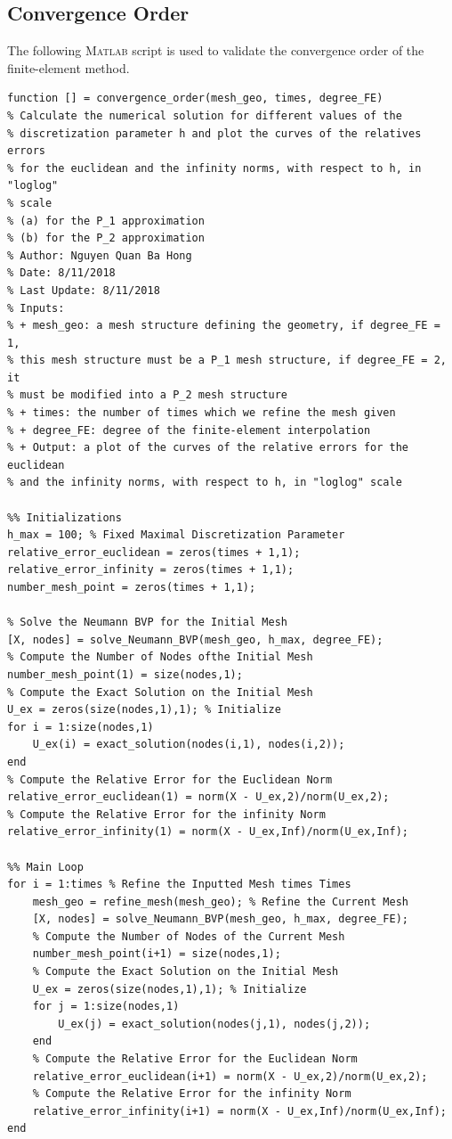 \documentclass[11pt,a4paper,center,notitlepage]{article}
\numberwithin{equation}{section}
\begin{document}
\subsection{Convergence Order}\label{sec3.5}
The following \textsc{Matlab} script is used to validate the convergence order of the finite-element method.
\begin{verbatim}
function [] = convergence_order(mesh_geo, times, degree_FE)
% Calculate the numerical solution for different values of the
% discretization parameter h and plot the curves of the relatives errors
% for the euclidean and the infinity norms, with respect to h, in "loglog"
% scale
% (a) for the P_1 approximation
% (b) for the P_2 approximation
% Author: Nguyen Quan Ba Hong
% Date: 8/11/2018
% Last Update: 8/11/2018
% Inputs:
% + mesh_geo: a mesh structure defining the geometry, if degree_FE = 1,
% this mesh structure must be a P_1 mesh structure, if degree_FE = 2, it
% must be modified into a P_2 mesh structure
% + times: the number of times which we refine the mesh given
% + degree_FE: degree of the finite-element interpolation
% + Output: a plot of the curves of the relative errors for the euclidean
% and the infinity norms, with respect to h, in "loglog" scale

%% Initializations
h_max = 100; % Fixed Maximal Discretization Parameter
relative_error_euclidean = zeros(times + 1,1);
relative_error_infinity = zeros(times + 1,1);
number_mesh_point = zeros(times + 1,1);

% Solve the Neumann BVP for the Initial Mesh
[X, nodes] = solve_Neumann_BVP(mesh_geo, h_max, degree_FE);
% Compute the Number of Nodes ofthe Initial Mesh
number_mesh_point(1) = size(nodes,1); 
% Compute the Exact Solution on the Initial Mesh
U_ex = zeros(size(nodes,1),1); % Initialize
for i = 1:size(nodes,1)
    U_ex(i) = exact_solution(nodes(i,1), nodes(i,2));
end
% Compute the Relative Error for the Euclidean Norm
relative_error_euclidean(1) = norm(X - U_ex,2)/norm(U_ex,2);
% Compute the Relative Error for the infinity Norm
relative_error_infinity(1) = norm(X - U_ex,Inf)/norm(U_ex,Inf);

%% Main Loop
for i = 1:times % Refine the Inputted Mesh times Times
    mesh_geo = refine_mesh(mesh_geo); % Refine the Current Mesh
    [X, nodes] = solve_Neumann_BVP(mesh_geo, h_max, degree_FE);
    % Compute the Number of Nodes of the Current Mesh
    number_mesh_point(i+1) = size(nodes,1);
    % Compute the Exact Solution on the Initial Mesh
    U_ex = zeros(size(nodes,1),1); % Initialize
    for j = 1:size(nodes,1)
        U_ex(j) = exact_solution(nodes(j,1), nodes(j,2));
    end
    % Compute the Relative Error for the Euclidean Norm
    relative_error_euclidean(i+1) = norm(X - U_ex,2)/norm(U_ex,2);
    % Compute the Relative Error for the infinity Norm
    relative_error_infinity(i+1) = norm(X - U_ex,Inf)/norm(U_ex,Inf);
end


\end{verbatim}
\end{document}
